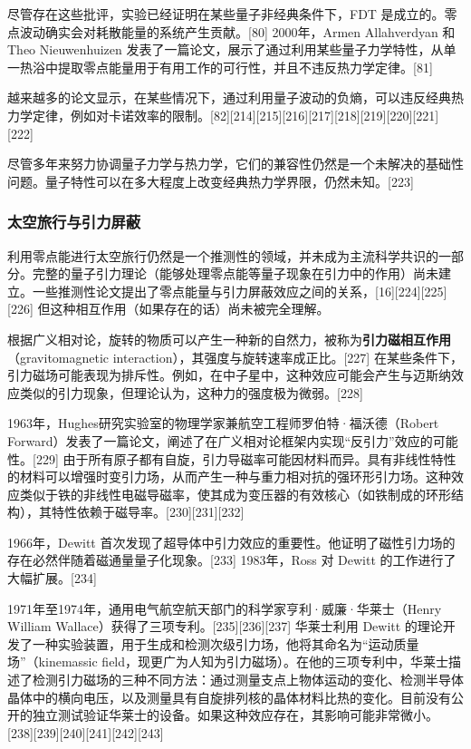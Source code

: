 尽管存在这些批评，实验已经证明在某些量子非经典条件下，FDT 是成立的。零点波动确实会对耗散能量的系统产生贡献。[80] 2000年，Armen Allahverdyan 和 Theo Nieuwenhuizen 发表了一篇论文，展示了通过利用某些量子力学特性，从单一热浴中提取零点能量用于有用工作的可行性，并且不违反热力学定律。[81]  

越来越多的论文显示，在某些情况下，通过利用量子波动的负熵，可以违反经典热力学定律，例如对卡诺效率的限制。[82][214][215][216][217][218][219][220][221][222]  

尽管多年来努力协调量子力学与热力学，它们的兼容性仍然是一个未解决的基础性问题。量子特性可以在多大程度上改变经典热力学界限，仍然未知。[223]
\subsubsection{太空旅行与引力屏蔽}
利用零点能进行太空旅行仍然是一个推测性的领域，并未成为主流科学共识的一部分。完整的量子引力理论（能够处理零点能等量子现象在引力中的作用）尚未建立。一些推测性论文提出了零点能量与引力屏蔽效应之间的关系，[16][224][225][226] 但这种相互作用（如果存在的话）尚未被完全理解。

根据广义相对论，旋转的物质可以产生一种新的自然力，被称为\textbf{引力磁相互作用}（gravitomagnetic interaction），其强度与旋转速率成正比。[227] 在某些条件下，引力磁场可能表现为排斥性。例如，在中子星中，这种效应可能会产生与迈斯纳效应类似的引力现象，但理论认为，这种力的强度极为微弱。[228]  

1963年，Hughes研究实验室的物理学家兼航空工程师罗伯特·福沃德（Robert Forward）发表了一篇论文，阐述了在广义相对论框架内实现“反引力”效应的可能性。[229] 由于所有原子都有自旋，引力导磁率可能因材料而异。具有非线性特性的材料可以增强时变引力场，从而产生一种与重力相对抗的强环形引力场。这种效应类似于铁的非线性电磁导磁率，使其成为变压器的有效核心（如铁制成的环形结构），其特性依赖于磁导率。[230][231][232]  

1966年，Dewitt 首次发现了超导体中引力效应的重要性。他证明了磁性引力场的存在必然伴随着磁通量量子化现象。[233] 1983年，Ross 对 Dewitt 的工作进行了大幅扩展。[234]  

1971年至1974年，通用电气航空航天部门的科学家亨利·威廉·华莱士（Henry William Wallace）获得了三项专利。[235][236][237] 华莱士利用 Dewitt 的理论开发了一种实验装置，用于生成和检测次级引力场，他将其命名为“运动质量场”（kinemassic field，现更广为人知为引力磁场）。在他的三项专利中，华莱士描述了检测引力磁场的三种不同方法：通过测量支点上物体运动的变化、检测半导体晶体中的横向电压，以及测量具有自旋排列核的晶体材料比热的变化。目前没有公开的独立测试验证华莱士的设备。如果这种效应存在，其影响可能非常微小。[238][239][240][241][242][243]  

